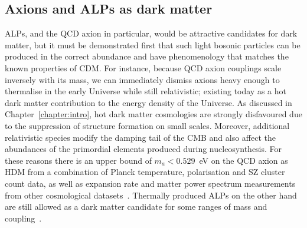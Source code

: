 \subsection{Axions and ALPs as dark matter}\label{sec:axions_axionsdm}
ALPs, and the QCD axion in particular, would be attractive candidates for dark matter, but it must be demonstrated first that such light bosonic particles can be produced in the correct abundance and have phenomenology that matches the known properties of CDM. For instance, because QCD axion couplings scale inversely with its mass, we can immediately dismiss axions heavy enough to thermalise in the early Universe while still relativistic; existing today as a hot dark matter contribution to the energy density of the Universe. As discussed in Chapter~\ref{chapter:intro}, hot dark matter cosmologies are strongly disfavoured due to the suppression of structure formation on small scales. Moreover, additional relativistic species modify the damping tail of the CMB and also affect the abundances of the primordial elements produced during nucleosynthesis. For these reasons there is an upper bound of $m_a < 0.529$~eV on the QCD axion as HDM from a combination of Planck temperature, polarisation and SZ cluster count data, as well as expansion rate and matter power spectrum measurements from other cosmological datasets~\cite{DiValentino:2015wba}. Thermally produced ALPs on the other hand are still allowed as a dark matter candidate for some ranges of mass and coupling~\cite{Cadamuro:2010cz}.

